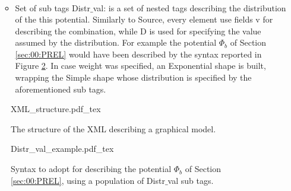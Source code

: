 \begin{itemize}
\begin{itemize}
\begin{eqnarray}
\end{eqnarray}
\item Set of sub tags Distr$\_$val: is a set of nested tags describing the distribution of the this potential.
Similarly to Source, every element use fields v for describing the combination, while D is used for specifying the value assumed by the distribution.
For example the potential $\Phi _b$ of Section \ref{sec:00:PREL} would have been described by the syntax reported in Figure \ref{fig:00:XML_struct:Distr_val}.
In case weight was specified, an Exponential shape is built, wrapping the Simple shape whose distribution is specified by the aforementioned sub tags.
\end{itemize}
\end{itemize}

\begin{figure}
	\centering
\def\svgwidth{0.95 \columnwidth}
{XML_structure.pdf_tex} 
	\caption{The structure of the XML describing a graphical model.}
	\label{fig:00:XML_struct}
\end{figure} 

\begin{figure}
	\centering
\def\svgwidth{0.6 \columnwidth}
{Distr_val_example.pdf_tex} 
	\caption{Syntax to adopt for describing the potential $\Phi _b$ of Section \ref{sec:00:PREL}, using a population of Distr$\_$val sub tags.}
	\label{fig:00:XML_struct:Distr_val}
\end{figure} 



